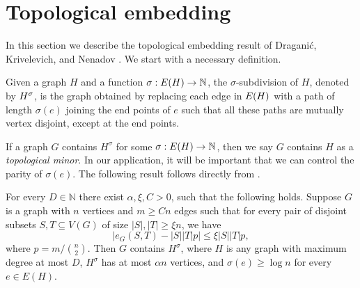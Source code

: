 \documentclass[11pt]{article}
\begin{document}
%   



\section{Topological embedding}


In this section we describe the topological embedding result of Dragani\'c, Krivelevich, and Nenadov \cite{draganic22rolling}. We start with a necessary definition.

\begin{definition}
Given a graph $H$ and a function $\sigma: E(H) \rightarrow \mathbb{N}$, the $\sigma$-subdivision of $H$, denoted by ${H}^{\sigma}$, is the graph obtained by replacing each edge in $E(H)$ with a path of length $\sigma(e)$ joining the end points of $e$ such that all these paths are mutually vertex disjoint, except at the end points.
\end{definition}

If a graph $G$ contains $H^{\sigma}$ for some $\sigma: E(H) \to \mathbb{N}$, then we say $G$ contains $H$ as a \emph{topological minor}. In our application, it will be important that we can control the parity of $\sigma(e)$. The following result follows directly from \cite[Theorem 1]{draganic22rolling}. 


\begin{theorem} 
For every $D \in \mathbb{N}$ there exist $\alpha, \xi, C > 0$, such that the following holds. Suppose $G$ is a graph with $n$ vertices and $m \ge Cn$ edges such that for every pair of disjoint subsets $S, T \subseteq V(G)$ of size $|S|, |T| \ge \xi n$, we have
$$
    \bigl| e_{G}(S, T) - |S||T|p \bigr| \le \xi |S||T| p, 
$$
where $p = m / \binom{n}{2}$. Then $G$ contains $H^{\sigma}$, where $H$ is any graph with maximum degree at most $D$, $H^\sigma$ has at most $\alpha n$ vertices, and $\sigma(e) \ge \log n$ for every $e \in E(H)$.
\end{theorem}
\end{document}
